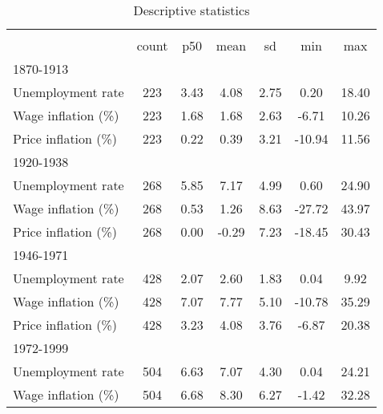\begin{table}[htbp]\centering
\def\sym#1{\ifmmode^{#1}\else\(^{#1}\)\fi}
\caption{Descriptive statistics \label{T:Descriptives}}
\begin{tabular}{l*{1}{cccccc}}
\hline\hline
                    &\multicolumn{6}{c}{}                                                         \\
                    &       count&         p50&        mean&          sd&         min&         max\\
\hline
1870-1913           &            &            &            &            &            &            \\
Unemployment rate   &         223&        3.43&        4.08&        2.75&        0.20&       18.40\\
Wage inflation (\%) &         223&        1.68&        1.68&        2.63&       -6.71&       10.26\\
Price inflation (\%)&         223&        0.22&        0.39&        3.21&      -10.94&       11.56\\
\hline
1920-1938           &            &            &            &            &            &            \\
Unemployment rate   &         268&        5.85&        7.17&        4.99&        0.60&       24.90\\
Wage inflation (\%) &         268&        0.53&        1.26&        8.63&      -27.72&       43.97\\
Price inflation (\%)&         268&        0.00&       -0.29&        7.23&      -18.45&       30.43\\
\hline
1946-1971           &            &            &            &            &            &            \\
Unemployment rate   &         428&        2.07&        2.60&        1.83&        0.04&        9.92\\
Wage inflation (\%) &         428&        7.07&        7.77&        5.10&      -10.78&       35.29\\
Price inflation (\%)&         428&        3.23&        4.08&        3.76&       -6.87&       20.38\\
\hline
1972-1999           &            &            &            &            &            &            \\
Unemployment rate   &         504&        6.63&        7.07&        4.30&        0.04&       24.21\\
Wage inflation (\%) &         504&        6.68&        8.30&        6.27&       -1.42&       32.28\\

\end{tabular}
\end{table}

